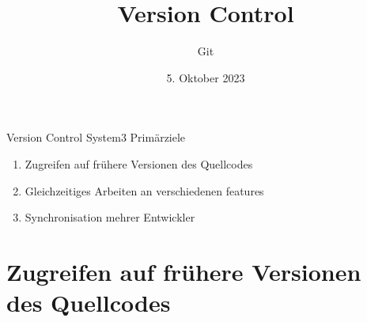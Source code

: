 \documentclass{setbeamer}
\title{Version Control}
\subtitle{Git}
\institute{\theChairName\\\theDepartmentName\\\theUniversityName}
\date[05.10.2023]{5. Oktober 2023}
\begin{document}
\maketitle

\begin{frame}{Version Control System}{3 Primärziele}
    \begin{enumerate}
        \item Zugreifen auf frühere Versionen des Quellcodes
        \item Gleichzeitiges Arbeiten an verschiedenen features
        \item Synchronisation mehrer Entwickler
    \end{enumerate}
\end{frame}



\section{Zugreifen auf frühere Versionen des Quellcodes}
\end{document}
